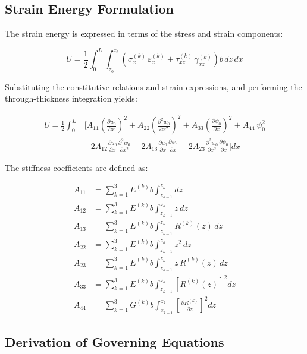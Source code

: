\documentclass[12pt,a4paper]{report}
\begin{document}
\subsection*{Strain Energy Formulation}

The strain energy is expressed in terms of the stress and strain components:

\begin{equation}
U = \frac{1}{2} \int_0^L \int_{z_0}^{z_3} 
\left( \sigma_x^{(k)} \, \varepsilon_x^{(k)} 
     + \tau_{xz}^{(k)} \, \gamma_{xz}^{(k)} \right) 
b \, dz \, dx
\end{equation}

Substituting the constitutive relations and strain expressions, and performing the through-thickness integration yields:

\begin{align}
U = \frac{1}{2} \int_0^L &\Bigg[ 
A_{11} \left(\frac{\partial u_0}{\partial x}\right)^2 
+ A_{22} \left(\frac{\partial^2 w_0}{\partial x^2}\right)^2 
+ A_{33} \left(\frac{\partial \psi_0}{\partial x}\right)^2 
+ A_{44} \, \psi_0^2 \nonumber \\[6pt]
&- 2A_{12} \frac{\partial u_0}{\partial x} \frac{\partial^2 w_0}{\partial x^2} 
+ 2A_{13} \frac{\partial u_0}{\partial x} \frac{\partial \psi_0}{\partial x} 
- 2A_{23} \frac{\partial^2 w_0}{\partial x^2} \frac{\partial \psi_0}{\partial x}
\Bigg] dx
\end{align}

The stiffness coefficients are defined as:

\begin{align}
A_{11} &= \sum_{k=1}^{3} E^{(k)} b \int_{z_{k-1}}^{z_k} dz \\[6pt]
A_{12} &= \sum_{k=1}^{3} E^{(k)} b \int_{z_{k-1}}^{z_k} z \, dz \\[6pt]
A_{13} &= \sum_{k=1}^{3} E^{(k)} b \int_{z_{k-1}}^{z_k} R^{(k)}(z) \, dz \\[6pt]
A_{22} &= \sum_{k=1}^{3} E^{(k)} b \int_{z_{k-1}}^{z_k} z^2 \, dz \\[6pt]
A_{23} &= \sum_{k=1}^{3} E^{(k)} b \int_{z_{k-1}}^{z_k} z \, R^{(k)}(z) \, dz \\[6pt]
A_{33} &= \sum_{k=1}^{3} E^{(k)} b \int_{z_{k-1}}^{z_k} \left[R^{(k)}(z)\right]^2 dz \\[6pt]
A_{44} &= \sum_{k=1}^{3} G^{(k)} b \int_{z_{k-1}}^{z_k} \left[ \frac{\partial R^{(k)}}{\partial z} \right]^2 dz
\end{align}


\subsection*{Derivation of Governing Equations}
\end{document}
